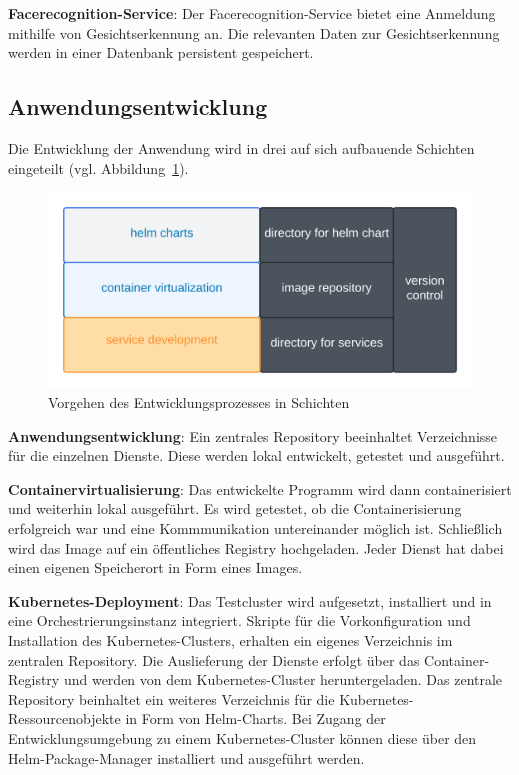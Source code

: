 \textbf{Facerecognition-Service}: Der Facerecognition-Service bietet eine Anmeldung mithilfe von Gesichtserkennung an.
Die relevanten Daten zur Gesichtserkennung werden in einer Datenbank persistent gespeichert.

\subsection{Anwendungsentwicklung}
Die Entwicklung der Anwendung wird in drei auf sich aufbauende Schichten eingeteilt (vgl. Abbildung~\ref{fig:Schichtenentwurf}).

\begin{figure}[!htb]
    \centering
    \includegraphics[width=1.0\columnwidth]{images/Schichtenentwurf.png}
    \caption{Vorgehen des Entwicklungsprozesses in Schichten}
    \label{fig:Schichtenentwurf}
  \end{figure}

\textbf{Anwendungsentwicklung}: 
Ein zentrales Repository beeinhaltet Verzeichnisse für die einzelnen Dienste.
Diese werden lokal entwickelt, getestet und ausgeführt.

\textbf{Containervirtualisierung}: 
Das entwickelte Programm wird dann containerisiert und weiterhin lokal ausgeführt.
Es wird getestet, ob die Containerisierung erfolgreich war und eine Kommmunikation untereinander möglich ist. 
Schließlich wird das Image auf ein öffentliches Registry hochgeladen. 
Jeder Dienst hat dabei einen eigenen Speicherort in Form eines Images.

\textbf{Kubernetes-Deployment}: 
Das Testcluster wird aufgesetzt, installiert und in eine Orchestrierungsinstanz integriert.
Skripte für die Vorkonfiguration und Installation des Kubernetes-Clusters, erhalten ein eigenes Verzeichnis im zentralen Repository.
Die Auslieferung der Dienste erfolgt über das Container-Registry und werden von dem Kubernetes-Cluster heruntergeladen.
Das zentrale Repository beinhaltet ein weiteres Verzeichnis für die Kubernetes-Ressourcenobjekte in Form von Helm-Charts.
Bei Zugang der Entwicklungsumgebung zu einem Kubernetes-Cluster können diese über den Helm-Package-Manager installiert und ausgeführt werden.



